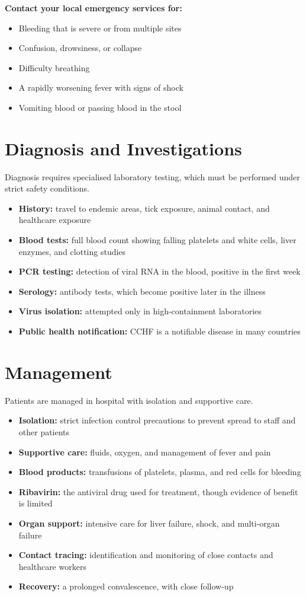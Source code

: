\textbf{Contact your local emergency services for:}
\begin{itemize}
    \item Bleeding that is severe or from multiple sites
    \item Confusion, drowsiness, or collapse
    \item Difficulty breathing
    \item A rapidly worsening fever with signs of shock
    \item Vomiting blood or passing blood in the stool
\end{itemize}

\section*{Diagnosis and Investigations}
Diagnosis requires specialised laboratory testing, which must be performed under strict safety conditions.

\begin{itemize}
    \item \textbf{History:} travel to endemic areas, tick exposure, animal contact, and healthcare exposure
    \item \textbf{Blood tests:} full blood count showing falling platelets and white cells, liver enzymes, and clotting studies
    \item \textbf{PCR testing:} detection of viral RNA in the blood, positive in the first week
    \item \textbf{Serology:} antibody tests, which become positive later in the illness
    \item \textbf{Virus isolation:} attempted only in high-containment laboratories
    \item \textbf{Public health notification:} CCHF is a notifiable disease in many countries
\end{itemize}

\section*{Management}
Patients are managed in hospital with isolation and supportive care.

\begin{itemize}
    \item \textbf{Isolation:} strict infection control precautions to prevent spread to staff and other patients
    \item \textbf{Supportive care:} fluids, oxygen, and management of fever and pain
    \item \textbf{Blood products:} transfusions of platelets, plasma, and red cells for bleeding
    \item \textbf{Ribavirin:} the antiviral drug used for treatment, though evidence of benefit is limited
    \item \textbf{Organ support:} intensive care for liver failure, shock, and multi-organ failure
    \item \textbf{Contact tracing:} identification and monitoring of close contacts and healthcare workers
    \item \textbf{Recovery:} a prolonged convalescence, with close follow-up
\end{itemize}


